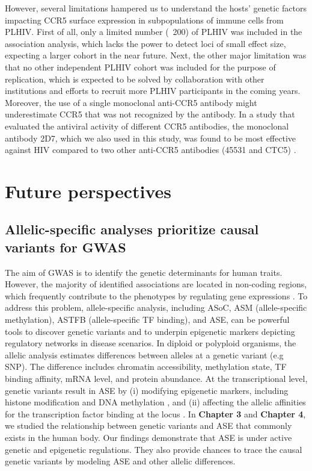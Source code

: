 \documentclass{book}
\begin{document}
\begin{refsection}
However, several limitations hampered us to understand the hosts' genetic factors impacting CCR5 surface expression in subpopulations of immune cells from PLHIV.
First of all, only a limited number (~200) of PLHIV was included in the association analysis, which lacks the power to detect loci of small effect size, expecting a larger cohort in the near future.
Next, the other major limitation was that no other independent PLHIV cohort was included for the purpose of replication, which is expected to be solved by collaboration with other institutions and efforts to recruit more PLHIV participants in the coming years.
Moreover, the use of a single monoclonal anti-CCR5 antibody might underestimate CCR5 that was not recognized by the antibody.
In a study that evaluated the antiviral activity of different CCR5 antibodies, the monoclonal antibody 2D7, which we also used in this study, was found to be most effective against HIV compared to two other anti-CCR5 antibodies (45531 and CTC5) \cite{Colin2018CCR5}.

\section*{Future perspectives}
\subsection*{Allelic-specific analyses prioritize causal variants for GWAS}
The aim of GWAS is to identify the genetic determinants for human traits.
However, the majority of identified associations are located in non-coding regions, which frequently contribute to the phenotypes by regulating gene expressions \cite{Tam2019Benefits,Manolio2013Bringing}.
To address this problem, allele-specific analysis, including ASoC, ASM (allele-specific methylation), ASTFB (allele-specific TF binding), and ASE, can be powerful tools to discover genetic variants and to underpin epigenetic markers depicting regulatory networks in disease scenarios.
In diploid or polyploid organisms, the allelic analysis estimates differences between alleles at a genetic variant (e.g SNP).
The difference includes chromatin accessibility, methylation state, TF binding affinity, mRNA level, and protein abundance.
At the transcriptional level, genetic variants result in ASE by (i) modifying epigenetic markers, including histone modification and DNA methylation \cite{Zhang2020Allele,Do2020Allele}, and (ii) affecting the allelic affinities for the transcription factor binding at the locus \cite{Cleary2021Perspectives}.
In \textbf{Chapter 3} and \textbf{Chapter 4}, we studied the relationship between genetic variants and ASE that commonly exists in the human body.
Our findings demonstrate that ASE is under active genetic and epigenetic regulations.
They also provide chances to trace the causal genetic variants by modeling ASE and other allelic differences.


\end{refsection}
\end{document}
